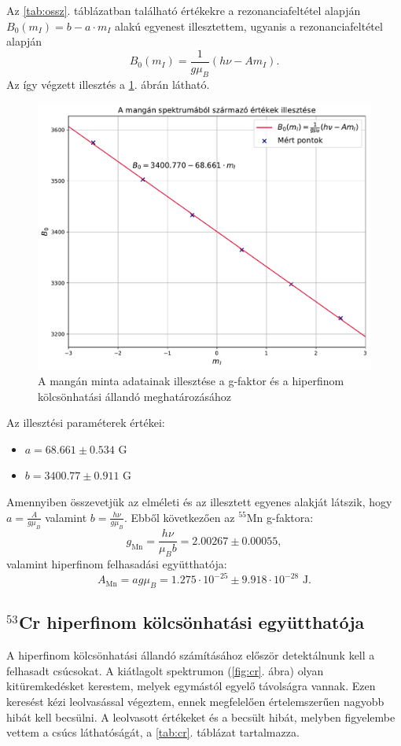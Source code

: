 \documentclass[12pt,a4paper]{article}
\begin{document}
\newpage
Az \ref{tab:ossz}. táblázatban található értékekre a rezonanciafeltétel alapján $B_0(m_I) = b-a\cdot m_I$ alakú egyenest illesztettem, ugyanis a rezonanciafeltétel alapján 
\begin{equation}
B_0(m_I)=\frac{1}{g\mu_B}(h\nu-Am_I).
\end{equation}
Az így végzett illesztés a \ref{fig:mn_illesztes}. ábrán látható.\\
\begin{figure}[!h]
\centering
\includegraphics[scale=0.55]{mn_hf_fit}
\caption{A mangán minta adatainak illesztése a g-faktor és a hiperfinom kölcsönhatási állandó meghatározásához}
\label{fig:mn_illesztes}
\end{figure}
\newpage
Az illesztési paraméterek értékei:
\begin{itemize}
\item{$a=68.661 \pm 0.534 $ G}
\item{$b=3400.77 \pm 0.911 $ G}
\end{itemize}
Amennyiben összevetjük az elméleti és az illesztett egyenes alakját látszik, hogy $a=\frac{A}{g\mu_B}$ valamint $b=\frac{h\nu}{g\mu_B}$. Ebből következően az $^{55}$Mn g-faktora:
$$g_{\textrm{Mn}}=\frac{h\nu}{\mu_B b}=2.00267 \pm 0.00055, $$
valamint hiperfinom felhasadási együtthatója:
$$A_{\textrm{Mn}}=ag\mu_B = 1.275\cdot 10^{-25} \pm 9.918 \cdot 10^{-28} \textrm{ J}. $$

\subsection{$^{53}$Cr hiperfinom kölcsönhatási együtthatója}
\hspace*{10pt} A hiperfinom kölcsönhatási állandó számításához először detektálnunk kell a felhasadt csúcsokat. A kiátlagolt spektrumon (\ref{fig:cr}. ábra) olyan kitüremkedésket kerestem, melyek egymástól egyelő távolságra vannak. Ezen keresést kézi leolvasással végeztem, ennek megfelelően értelemszerűen nagyobb hibát kell becsülni. A leolvasott értékeket és a becsült hibát, melyben figyelembe vettem a csúcs láthatóságát, a \ref{tab:cr}. táblázat tartalmazza.\\
\end{document}
